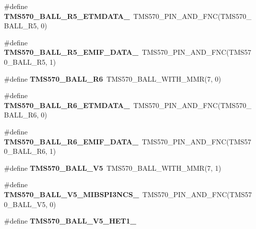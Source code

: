 \begin{DoxyCompactItemize}
\#define {\bfseries T\+M\+S570\+\_\+\+B\+A\+L\+L\+\_\+\+R5\+\_\+\+E\+T\+M\+D\+A\+T\+A\+\_}~T\+M\+S570\+\_\+\+P\+I\+N\+\_\+\+A\+N\+D\+\_\+\+F\+NC(T\+M\+S570\+\_\+\+B\+A\+L\+L\+\_\+\+R5, 0)
\item 
\mbox{\label{tms570ls3137zwt-pins_8h_a470a025def4f69b68b02693228a0eb67}} 
\#define {\bfseries T\+M\+S570\+\_\+\+B\+A\+L\+L\+\_\+\+R5\+\_\+\+E\+M\+I\+F\+\_\+\+D\+A\+T\+A\+\_}~T\+M\+S570\+\_\+\+P\+I\+N\+\_\+\+A\+N\+D\+\_\+\+F\+NC(T\+M\+S570\+\_\+\+B\+A\+L\+L\+\_\+\+R5, 1)
\item 
\mbox{\label{tms570ls3137zwt-pins_8h_a4945db79045a394c68189f740ac3d839}} 
\#define {\bfseries T\+M\+S570\+\_\+\+B\+A\+L\+L\+\_\+\+R6}~T\+M\+S570\+\_\+\+B\+A\+L\+L\+\_\+\+W\+I\+T\+H\+\_\+\+M\+MR(7, 0)
\item 
\mbox{\label{tms570ls3137zwt-pins_8h_aacf38b266de3c50fe95ce8401f683650}} 
\#define {\bfseries T\+M\+S570\+\_\+\+B\+A\+L\+L\+\_\+\+R6\+\_\+\+E\+T\+M\+D\+A\+T\+A\+\_}~T\+M\+S570\+\_\+\+P\+I\+N\+\_\+\+A\+N\+D\+\_\+\+F\+NC(T\+M\+S570\+\_\+\+B\+A\+L\+L\+\_\+\+R6, 0)
\item 
\mbox{\label{tms570ls3137zwt-pins_8h_a2112efbee82f681b13f2c8ef0db72b69}} 
\#define {\bfseries T\+M\+S570\+\_\+\+B\+A\+L\+L\+\_\+\+R6\+\_\+\+E\+M\+I\+F\+\_\+\+D\+A\+T\+A\+\_}~T\+M\+S570\+\_\+\+P\+I\+N\+\_\+\+A\+N\+D\+\_\+\+F\+NC(T\+M\+S570\+\_\+\+B\+A\+L\+L\+\_\+\+R6, 1)
\item 
\mbox{\label{tms570ls3137zwt-pins_8h_a33cea185253bfd2f8673d380af8dd297}} 
\#define {\bfseries T\+M\+S570\+\_\+\+B\+A\+L\+L\+\_\+\+V5}~T\+M\+S570\+\_\+\+B\+A\+L\+L\+\_\+\+W\+I\+T\+H\+\_\+\+M\+MR(7, 1)
\item 
\mbox{\label{tms570ls3137zwt-pins_8h_aa72f67e4949a7f273517db9aa68e72ee}} 
\#define {\bfseries T\+M\+S570\+\_\+\+B\+A\+L\+L\+\_\+\+V5\+\_\+\+M\+I\+B\+S\+P\+I3\+N\+C\+S\+\_}~T\+M\+S570\+\_\+\+P\+I\+N\+\_\+\+A\+N\+D\+\_\+\+F\+NC(T\+M\+S570\+\_\+\+B\+A\+L\+L\+\_\+\+V5, 0)
\item 
\#define {\bfseries T\+M\+S570\+\_\+\+B\+A\+L\+L\+\_\+\+V5\+\_\+\+H\+E\+T1\+\_}
\item 
\mbox{\label{tms570ls3137zwt-pins_8h_a728407fb1b127d475568aae25287cf49}} 

\end{DoxyCompactItemize}
